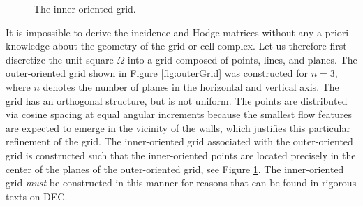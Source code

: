 \begin{figure}[ht]
    \caption{The inner-oriented grid.}
    \label{fig:innerGrid}
\end{figure}

It is impossible to derive the incidence and Hodge matrices without any a priori knowledge about the geometry of the grid or cell-complex. Let us therefore first discretize the unit square $\Omega$ into a grid composed of points, lines, and planes. The outer-oriented grid shown in Figure \ref{fig:outerGrid} was constructed for $n = 3$, where $n$ denotes the number of planes in the horizontal and vertical axis. The grid has an orthogonal structure, but is not uniform. The points are distributed via cosine spacing at equal angular increments because the smallest flow features are expected to emerge in the vicinity of the walls, which justifies this particular refinement of the grid. The inner-oriented grid associated with the outer-oriented grid is constructed such that the inner-oriented points are located precisely in the center of the planes of the outer-oriented grid, see Figure \ref{fig:innerGrid}. The inner-oriented grid \emph{must} be constructed in this manner for reasons that can be found in rigorous texts on DEC.

